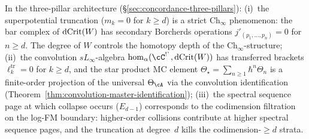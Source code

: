 \begin{remark}
\label{rem:deformation-three-pillar}
In the three-pillar architecture
(\S\ref{sec:concordance-three-pillars}):
(i)~the superpotential truncation ($m_k = 0$ for $k \geq d$)
is a strict $\mathrm{Ch}_\infty$ phenomenon: the bar complex of
$\mathrm{dCrit}(W)$ has secondary Borcherds operations
$j'_{(p_1,\ldots,p_n)} = 0$ for $n \geq d$. The degree of $W$
controls the homotopy depth of the $\mathrm{Ch}_\infty$-structure;
(ii)~the convolution $sL_\infty$-algebra
$\operatorname{hom}_\alpha(\cC^{\textup{!\textasciigrave}}, \dCrit(W))$ has
transferred brackets $\ell_k^{\mathrm{tr}} = 0$ for $k \geq d$,
and the star product MC element $\Theta_{\star} =
\sum_{n \geq 1} \hbar^n \Theta_n$ is a finite-order projection of
the universal $\Theta_\cA$ via the convolution identification
(Theorem~\ref{thm:convolution-master-identification});
(iii)~the spectral sequence page at which collapse occurs
($E_{d-1}$) corresponds to the codimension filtration on the
log-FM boundary: higher-order collisions contribute at higher
spectral sequence pages, and the truncation at degree~$d$ kills
the codimension-$\geq d$ strata.
\end{remark}
